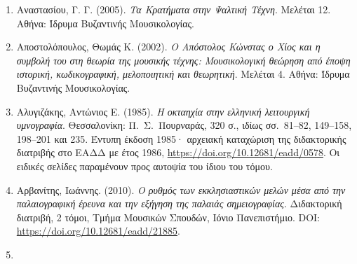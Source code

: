 \documentclass[11pt,a4paper]{article}
\providecommand{\tightlist}{\setlength{\itemsep}{0pt}\setlength{\parskip}{0pt}}
\begin{document}
\begin{enumerate}
\def\labelenumi{\arabic{enumi}.}
\tightlist

\item
 Αναστασίου, Γ. Γ. (2005). \emph{Τα Κρατήματα στην Ψαλτική Τέχνη}. Μελέται 12. Αθήνα: Ίδρυμα Βυζαντινής Μουσικολογίας.
\item
 Αποστολόπουλος, Θωμάς Κ. (2002). \emph{Ο Απόστολος Κώνστας ο Χίος και η συμβολή του στη θεωρία της μουσικής τέχνης: Μουσικολογική θεώρηση από έποψη ιστορική, κωδικογραφική, μελοποιητική και θεωρητική}. Μελέται 4. Αθήνα: Ίδρυμα Βυζαντινής Μουσικολογίας.
\item
 Αλυγιζάκης, Αντώνιος Ε. (1985). \emph{Η οκταηχία στην ελληνική λειτουργική υμνογραφία}. Θεσσαλονίκη: Π.~Σ.~Πουρναράς, 320 σ., ιδίως σσ.~81--82, 149--158, 198--201 και 235. Έντυπη έκδοση 1985· αρχειακή καταχώριση της διδακτορικής διατριβής στο ΕΑΔΔ με έτος 1986, \url{https://doi.org/10.12681/eadd/0578}. Οι ειδικές σελίδες παραμένουν προς αυτοψία του ίδιου του τόμου.
\item
  Αρβανίτης, Ιωάννης. (2010). \emph{Ο ρυθμός των εκκλησιαστικών μελών μέσα από την παλαιογραφική έρευνα και την εξήγηση της παλαιάς σημειογραφίας}. Διδακτορική διατριβή, 2 τόμοι, Τμήμα Μουσικών Σπουδών, Ιόνιο Πανεπιστήμιο. DOI: \url{https://doi.org/10.12681/eadd/21885}.
\item
 


\end{enumerate}
\end{document}
